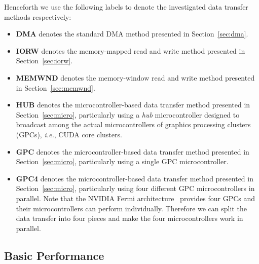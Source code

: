 Henceforth we use the following labels to denote the investigated data
transfer methods respectively:
\begin{itemize}
 \item \textbf{DMA} denotes the standard DMA method presented in
       Section~\ref{sec:dma}.
 \item \textbf{IORW} denotes the memory-mapped read and write method
       presented in Section~\ref{sec:iorw}.
 \item \textbf{MEMWND} denotes the memory-window read and write method
       presented in Section~\ref{sec:memwnd}.
 \item \textbf{HUB} denotes the microcontroller-based data transfer
       method presented in Section~\ref{sec:micro}, particularly using a
       \textit{hub} microcontroller designed to broadcast among the
       actual microcontrollers of graphics processing clusters (GPCs),
       \textit{i.e.}, CUDA core clusters.
 \item \textbf{GPC} denotes the microcontroller-based data transfer
       method presented in Section~\ref{sec:micro}, particularly using a
       single GPC microcontroller.
 \item \textbf{GPC4} denotes the microcontroller-based data transfer
       method presented in Section~\ref{sec:micro}, particularly using
       four different GPC microcontrollers in parallel.
       Note that the NVIDIA Fermi architecture~\cite{NVIDIA_Fermi}
       provides four GPCs and their microcontrollers can perform
       individually.
       Therefore we can split the data transfer into four pieces and
       make the four microcontrollers work in parallel.
\end{itemize}

\subsection{Basic Performance}

